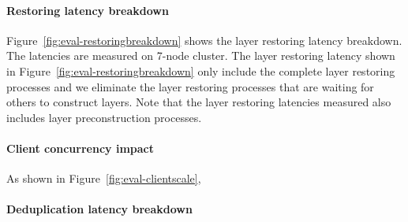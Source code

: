 \paragraph{Restoring latency breakdown}

Figure~\ref{fig:eval-restoringbreakdown} shows 
the layer restoring latency breakdown.
The latencies are measured on 7-node cluster.
The layer restoring latency shown in Figure~\ref{fig:eval-restoringbreakdown}
only include the complete layer restoring processes
and we eliminate the layer restoring processes that are waiting for
others to construct layers.
Note that the layer restoring latencies measured also includes
layer preconstruction processes.

\paragraph{Client concurrency impact}

As shown in Figure~\ref{fig:eval-clientscale},

\paragraph{Deduplication latency breakdown}



